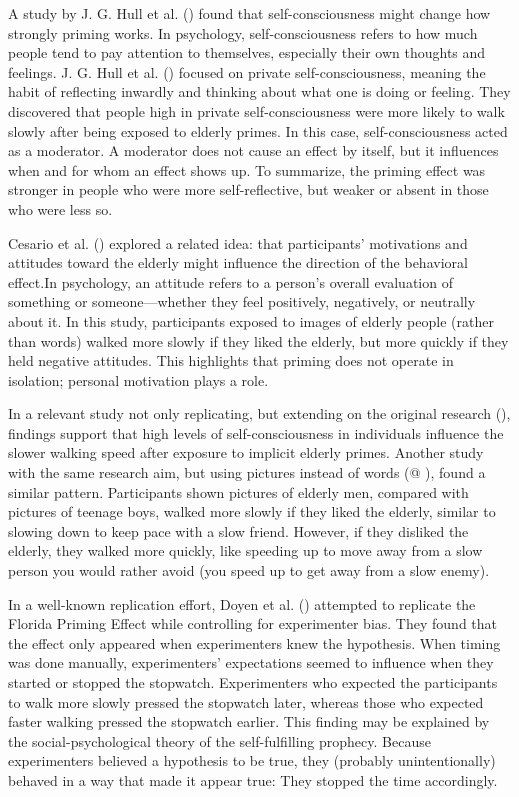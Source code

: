 \documentclass[
  letterpaper,
]{book}
\begin{document}
A study by J. G. Hull et al.
() found that
self-consciousness might change how strongly priming works. In
psychology, self-consciousness refers to how much people tend to pay
attention to themselves, especially their own thoughts and feelings. J.
G. Hull et al. () focused
on private self-consciousness, meaning the habit of reflecting inwardly
and thinking about what one is doing or feeling. They discovered that
people high in private self-consciousness were more likely to walk
slowly after being exposed to elderly primes. In this case,
self-consciousness acted as a moderator. A moderator does not cause an
effect by itself, but it influences when and for whom an effect shows
up. To summarize, the priming effect was stronger in people who were
more self-reflective, but weaker or absent in those who were less so.

Cesario et al. () explored a
related idea: that participants' motivations and attitudes toward the
elderly might influence the direction of the behavioral effect.In
psychology, an attitude refers to a person's overall evaluation of
something or someone---whether they feel positively, negatively, or
neutrally about it. In this study, participants exposed to images of
elderly people (rather than words) walked more slowly if they liked the
elderly, but more quickly if they held negative attitudes. This
highlights that priming does not operate in isolation; personal
motivation plays a role.

In a relevant study not only replicating, but extending on the original
research (), findings support that high levels of self-consciousness in
individuals influence the slower walking speed after exposure to
implicit elderly primes. Another study with the same research aim, but
using pictures instead of words (@
), found a
similar pattern. Participants shown pictures of elderly men, compared
with pictures of teenage boys, walked more slowly if they liked the
elderly, similar to slowing down to keep pace with a slow friend.
However, if they disliked the elderly, they walked more quickly, like
speeding up to move away from a slow person you would rather avoid (you
speed up to get away from a slow enemy).

In a well-known replication effort, Doyen et al.
() attempted to replicate the
Florida Priming Effect while controlling for experimenter bias. They
found that the effect only appeared when experimenters knew the
hypothesis. When timing was done manually, experimenters' expectations
seemed to influence when they started or stopped the stopwatch.
Experimenters who expected the participants to walk more slowly pressed
the stopwatch later, whereas those who expected faster walking pressed
the stopwatch earlier. This finding may be explained by the
social-psychological theory of the self-fulfilling prophecy. Because
experimenters believed a hypothesis to be true, they (probably
unintentionally) behaved in a way that made it appear true: They stopped
the time accordingly.
\end{document}
